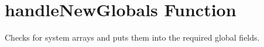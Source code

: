 \section{handleNewGlobals Function} 

Checks for system arrays and puts them into the required global fields.
